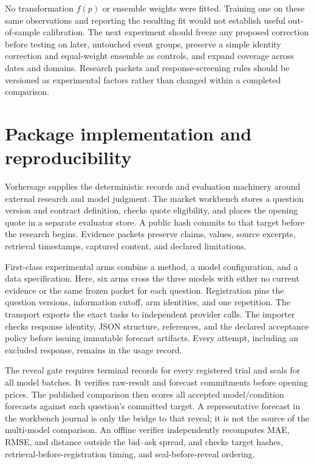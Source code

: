 \documentclass[11pt]{article}
\begin{document}
No transformation $f(p)$ or ensemble weights were fitted. Training one on these
same observations and reporting the resulting fit would not establish useful
out-of-sample calibration. The next experiment should freeze any proposed
correction before testing on later, untouched event groups, preserve a simple
identity correction and equal-weight ensemble as controls, and expand coverage
across dates and domains. Research packets and response-screening rules should
be versioned as experimental factors rather than changed within a completed
comparison.

\appendix
\section{Package implementation and reproducibility}
Vorhersage supplies the deterministic records and evaluation machinery around
external research and model judgment. The market workbench stores a question
version and contract definition, checks quote eligibility, and places the opening
quote in a separate evaluator store. A public hash commits to that target before
the research begins. Evidence packets preserve claims, values, source excerpts,
retrieval timestamps, captured content, and declared limitations.

First-class experimental arms combine a method, a model configuration, and a
data specification. Here, six arms cross the three models with either no
current evidence or the same frozen packet for each question. Registration pins
the question versions, information cutoff, arm identities, and one repetition.
The transport exports the exact tasks to independent provider calls. The
importer checks response identity, JSON structure, references, and the declared
acceptance policy before issuing immutable forecast artifacts. Every attempt,
including an excluded response, remains in the usage record.

The reveal gate requires terminal records for every registered trial and seals
for all model batches. It verifies raw-result and forecast commitments before
opening prices. The published comparison then scores all accepted model/condition
forecasts against each question's committed target. A representative forecast
in the workbench journal is only the bridge to that reveal; it is not the source
of the multi-model comparison. An offline verifier independently recomputes
MAE, RMSE, and distance outside the bid--ask spread, and checks target hashes,
retrieval-before-registration timing, and seal-before-reveal ordering.
\end{document}
